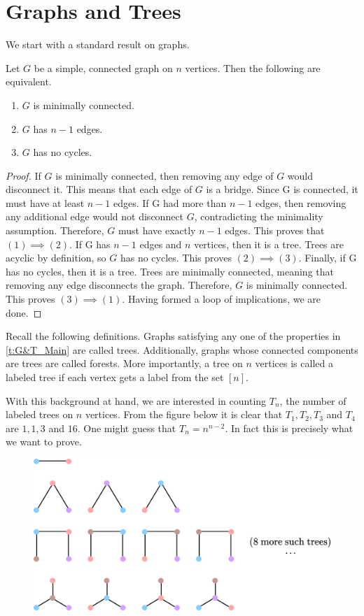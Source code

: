 \section{Graphs and Trees}
We start with a standard result on graphs.
\begin{theorem}
    Let $G$ be a simple, connected graph on $n$ vertices. Then the following are equivalent.
    \begin{enumerate}
        \item $G$ is minimally connected.
        \item $G$ has $n-1$ edges.
        \item $G$ has no cycles.
    \end{enumerate}
    \label{t:G&T_Main}
\end{theorem}
\begin{proof}
If $G$ is minimally connected, then removing any edge of $G$ would disconnect it. This means that each edge of $G$ is a bridge. Since G is connected, it must have at least $n-1$ edges. If G had more than $n-1$ edges, then removing any additional edge would not disconnect $G$, contradicting the minimality assumption. Therefore, $G$ must have exactly $n-1$ edges. This proves that $(1)\implies (2)$. If G has $n-1$ edges and $n$ vertices, then it is a tree. Trees are acyclic by definition, so $G$ has no cycles. This proves $(2)\implies (3)$. Finally, if G has no cycles, then it is a tree. Trees are minimally connected, meaning that removing any edge disconnects the graph. Therefore, $G$ is minimally connected. This proves $(3)\implies (1)$. Having formed a loop of implications, we are done.
\end{proof}
Recall the following definitions. Graphs satisfying any one of the properties in \cref{t:G&T_Main} are called trees. Additionally, graphs whose connected components are trees are called forests. More importantly, a tree on $n$ vertices is called a labeled tree if each vertex gets a label from the set $[n]$. 
\par
With this background at hand, we are interested in counting $T_n$, the number of labeled trees on $n$ vertices. From the figure below it is clear that $T_1,T_2,T_3$ and $T_4$ are $1,1,3$ and $16$. One might guess that $T_n=n^{n-2}$. In fact this is precisely what we want to prove.
\begin{figure}[H]
    \centering
    \includegraphics[width=0.9\linewidth]{Images/Figure29.png}
    \caption{}
    \label{f:Cayley Trees}
\end{figure}

